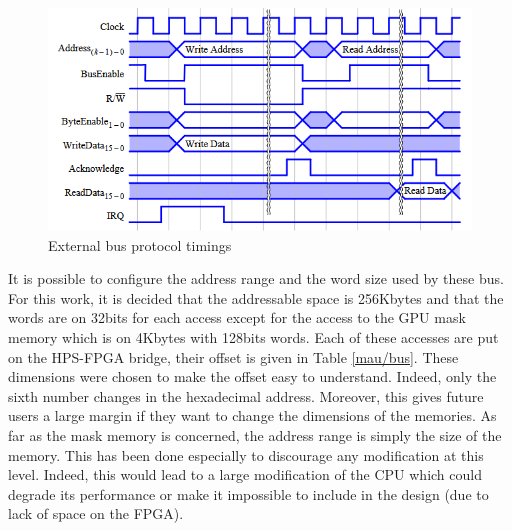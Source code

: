 \begin{figure}[H]
    \center
    \includegraphics[scale=0.8]{"Chapter6-MAU_CTRLU/res/external_bus_timings.PNG"}
    \caption{External bus protocol timings}
    \label{fig:mau/bus_bridge_protocol}
\end{figure}

It is possible to configure the address range and the word size used by these bus. For this work, 
it is decided that the 
addressable space is 256Kbytes and that the words are on 32bits for each access except for the 
access to the GPU mask memory which is on 4Kbytes with 128bits words. Each of these accesses are 
put on the HPS-FPGA bridge, their offset is given in Table \ref{mau/bus}. These dimensions were 
chosen to make the offset easy to understand. Indeed, only the sixth number changes in the 
hexadecimal address. Moreover, this gives future users a large margin if they want to change the 
dimensions of the memories. As far as the mask memory is concerned, the address range is simply the 
size of the memory. This has been done especially to discourage any modification at this level. 
Indeed, this would lead to a large modification of the CPU which could degrade its performance or 
make it impossible to include in the design (due to lack of space on the FPGA).

